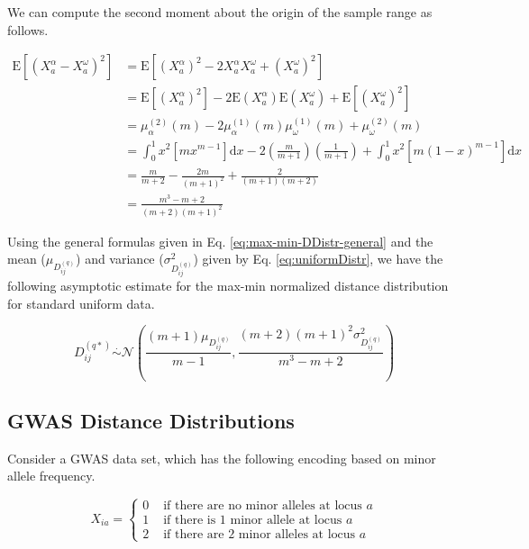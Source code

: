 \documentclass[10pt,letterpaper]{article}\usepackage[]{graphicx}\usepackage[]{color}
\begin{document}
We can compute the second moment about the origin of the sample range as follows.

\begin{equation}\label{eq:mu2_rng_uniform}
\begin{aligned}
\text{E}[(X^\alpha_a - X^\omega_a)^2] &= \text{E}[(X^\alpha_a)^2 - 2 X^\alpha_a X^\omega_a + (X^\omega_a)^2] \\
&= \text{E}[(X^\alpha_a)^2] - 2 \text{E}(X^\alpha_a) \text{E}(X^\omega_a) + \text{E}[(X^\omega_a)^2] \\
&= \mu^{(2)}_\alpha(m) - 2 \mu^{(1)}_\alpha(m) \mu^{(1)}_\omega(m) + \mu^{(2)}_\omega(m) \\
&= \int_{0}^{1} x^2 [m x^{m-1}] \text{d}x - 2 \left(\frac{m}{m+1}\right) \left(\frac{1}{m+1}\right) + \int_{0}^{1} x^2 [m (1 - x)^{m-1}] \text{d}x \\
&= \frac{m}{m+2} - \frac{2m}{(m+1)^2} + \frac{2}{(m+1)(m+2)} \\
&= \frac{m^3 - m + 2}{(m+2)(m+1)^2}
\end{aligned}
\end{equation}

Using the general formulas given in Eq. \ref{eq:max-min-DDistr-general} and the mean ($\mu_{D^{(q)}_{ij}}$) and variance ($\sigma^2_{D^{(q)}_{ij}}$) given by Eq. \ref{eq:uniformDistr}, we have the following asymptotic estimate for the max-min normalized distance distribution for standard uniform data.

\begin{equation}\label{eq:max-min_DDistr_uniform}
D^{(q*)}_{ij} \overset{.}{\sim} \mathcal{N}\left(\frac{(m+1)\mu_{D^{(q)}_{ij}}}{m-1}, \frac{(m+2)(m+1)^2 \sigma^2_{D^{(q)}_{ij}}}{m^3 - m + 2}\right)
\end{equation}

\subsection{GWAS Distance Distributions}

Consider a GWAS data set, which has the following encoding based on minor allele frequency.

\begin{equation}\label{eq:gwas_data}
X_{ia} = \begin{cases}
0 & \text{ if there are no minor alleles at locus } a  \\
1 & \text{ if there is 1 minor allele at locus } a \\
2 & \text{ if there are 2 minor alleles at locus } a
\end{cases}
\end{equation}
\end{document}
